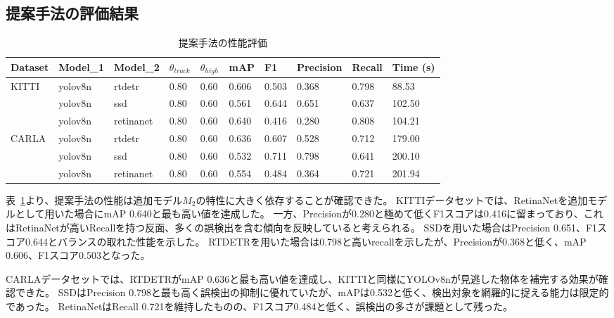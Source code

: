 \documentclass[conference, dvipdfmx]{IEEEtran}
\begin{document}
\begin{CJK}{UTF8}{min}
\subsection{提案手法の評価結果}
\begin{table}
    \caption{提案手法の性能評価}
    \centering
    \begin{tabular}{llllllllll}
    \toprule
    Dataset 
    & Model\_1 & Model\_2  & $\theta_{track}$ & $\theta_{high}$ & mAP   & F1    & Precision & Recall  & Time (s) \\
    \midrule
    \multirow{3}{*}{KITTI}
    & yolov8n  & rtdetr    & 0.80             & 0.60            & 0.606 & 0.503 & 0.368     & 0.798   & 88.53 \\
    & yolov8n  & ssd       & 0.80             & 0.60            & 0.561 & 0.644 & 0.651     & 0.637   & 102.50 \\
    & yolov8n  & retinanet & 0.80             & 0.60            & 0.640 & 0.416 & 0.280     & 0.808   & 104.21 \\
    \midrule
    \multirow{3}{*}{CARLA}
    & yolov8n & rtdetr     & 0.80             & 0.60            & 0.636 & 0.607 & 0.528     & 0.712   & 179.00 \\
    & yolov8n & ssd        & 0.80             & 0.60            & 0.532 & 0.711 & 0.798     & 0.641   & 200.10 \\
    & yolov8n & retinanet  & 0.80             & 0.60            & 0.554 & 0.484 & 0.364     & 0.721   & 201.94 \\
    \bottomrule
    \end{tabular}
    \label{tab:adrod}
\end{table}
表~\ref{tab:adrod}より、提案手法の性能は追加モデル$M_2$の特性に大きく依存することが確認できた。
KITTIデータセットでは、RetinaNetを追加モデルとして用いた場合にmAP 0.640と最も高い値を達成した。
一方、Precisionが0.280と極めて低くF1スコアは0.416に留まっており、これはRetinaNetが高いRecallを持つ反面、多くの誤検出を含む傾向を反映していると考えられる。
SSDを用いた場合はPrecision 0.651、F1スコア0.644とバランスの取れた性能を示した。
RTDETRを用いた場合は0.798と高いrecallを示したが、Precisionが0.368と低く、mAP 0.606、F1スコア0.503となった。

CARLAデータセットでは、RTDETRがmAP 0.636と最も高い値を達成し、KITTIと同様にYOLOv8nが見逃した物体を補完する効果が確認できた。
SSDはPrecision 0.798と最も高く誤検出の抑制に優れていたが、mAPは0.532と低く、検出対象を網羅的に捉える能力は限定的であった。
RetinaNetはRecall 0.721を維持したものの、F1スコア0.484と低く、誤検出の多さが課題として残った。


\end{CJK}
\end{document}
